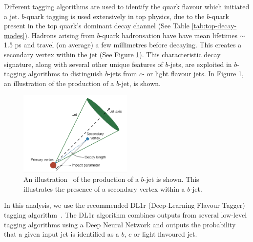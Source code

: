 Different tagging algorithms are used to identify the quark flavour which initiated a jet. $b$-quark tagging is used extensively in top physics, due to the $b$-quark present in the top quark's dominant decay channel (See Table \ref{tab:top-decay-modes}). Hadrons arising from $b$-quark hadronsation have have mean lifetimes $\sim$1.5 ps and travel (on average) a few millimetres before decaying. This creates a secondary vertex within the jet (See Figure \ref{fig:btag-pic}). This characteristic decay signature, along with several other unique features of $b$-jets, are exploited in $b$-tagging algorithms to distinguish $b$-jets from $c$- or light flavour jets. In Figure \ref{fig:btag-pic}, an illustration of the production of a $b$-jet, is shown.

\begin{figure}[h!]
 \includegraphics[width=0.5\textwidth]{figures/theoryFigs/b_tag_illustration.png}
 \centering
\caption{An illustration~\cite{Connelly2017PerformanceAC} of the production of a $b$-jet is shown. This illustrates the presence of a secondary vertex within a $b$-jet.}
\label{fig:btag-pic}
\end{figure}

In this analysis, we use the recommended DL1r (Deep-Learning Flavour Tagger) tagging algorithm~\cite{DL1r-slides}. The DL1r algorithm combines outputs from several low-level tagging algorithms using a Deep Neural Network and outputs the probability that a given input jet is identified as a $b$, $c$ or light flavoured jet.
